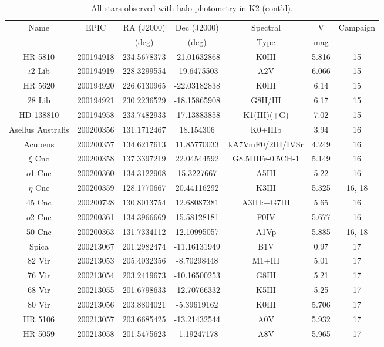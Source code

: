 \begin{table*}
\caption{All stars observed with halo photometry in K2 (cont'd).}
\begin{tabular}{ccccccc}
\hline \hline
Name & EPIC & RA (J2000) & Dec (J2000) & Spectral & V & Campaign \\
 &  & (deg) & (deg) & Type & mag &  \\
\hline
HR 5810 & 200194918 & 234.5678373 & -21.01632868 & K0III & 5.816 & 15 \\
$\iota$2 Lib & 200194919 & 228.3299554 & -19.6475503 & A2V & 6.066 & 15 \\
HR 5620 & 200194920 & 226.6130965 & -22.03182838 & K0III & 6.14 & 15 \\
28 Lib & 200194921 & 230.2236529 & -18.15865908 & G8II/III & 6.17 & 15 \\
HD 138810 & 200194958 & 233.7482933 & -17.13883858 & K1(III)(+G) & 7.02 & 15 \\
Asellus Australis & 200200356 & 131.1712467 & 18.154306 & K0+IIIb & 3.94 & 16 \\
Acubens & 200200357 & 134.6217613 & 11.85770033 & kA7VmF0/2III/IVSr & 4.249 & 16 \\
$\xi$ Cnc & 200200358 & 137.3397219 & 22.04544592 & G8.5IIIFe-0.5CH-1 & 5.149 & 16 \\
$o$1 Cnc & 200200360 & 134.3122908 & 15.3227667 & A5III & 5.22 & 16 \\
$\eta$ Cnc & 200200359 & 128.1770667 & 20.44116292 & K3III & 5.325 & 16, 18 \\
45 Cnc & 200200728 & 130.8013754 & 12.68087381 & A3III:+G7III & 5.65 & 16 \\
$o$2 Cnc & 200200361 & 134.3966669 & 15.58128181 & F0IV & 5.677 & 16 \\
50 Cnc & 200200363 & 131.7334112 & 12.10995057 & A1Vp & 5.885 & 16, 18 \\
Spica & 200213067 & 201.2982474 & -11.16131949 & B1V & 0.97 & 17 \\
82 Vir & 200213053 & 205.4032356 & -8.70298448 & M1+III & 5.01 & 17 \\
76 Vir & 200213054 & 203.2419673 & -10.16500253 & G8III & 5.21 & 17 \\
68 Vir & 200213055 & 201.6798633 & -12.70766332 & K5III & 5.25 & 17 \\
80 Vir & 200213056 & 203.8804021 & -5.39619162 & K0III & 5.706 & 17 \\
HR 5106 & 200213057 & 203.6685425 & -13.21432544 & A0V & 5.932 & 17 \\
HR 5059 & 200213058 & 201.5475623 & -1.19247178 & A8V & 5.965 & 17 \\

\end{tabular}
\end{table*}
